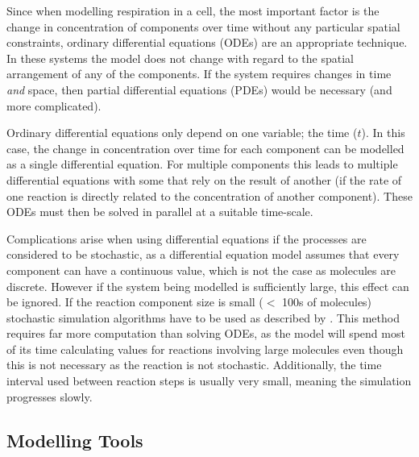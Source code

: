 Since when modelling respiration in a cell, the most important factor is the change in concentration of components over time without any particular spatial constraints, ordinary differential equations (ODEs) are an appropriate technique. In these systems the model does not change with regard to the spatial arrangement of any of the components. If the system requires changes in time \textit{and} space, then partial differential equations (PDEs) would be necessary (and more complicated)\cite{Klipp2005}.

Ordinary differential equations only depend on one variable; the time ($t$). In this case, the change in concentration over time for each component can be modelled as a single differential equation. For multiple components this leads to multiple differential equations with some that rely on the result of another (if the rate of one reaction is directly related to the concentration of another component). These ODEs must then be solved in parallel at a suitable time-scale.

Complications arise when using differential equations if the processes are considered to be stochastic, as a differential equation model assumes that every component can have a continuous value, which is not the case as molecules are discrete. However if the system being modelled is sufficiently large, this effect can be ignored. If the reaction component size is small ($<$ 100s of molecules) stochastic simulation algorithms have to be used as described by \citet{Gillespie1977}. This method requires far more computation than solving ODEs, as the model will spend most of its time calculating values for reactions involving large molecules even though this is not necessary as the reaction is not stochastic. Additionally, the time interval used between reaction steps is usually very small, meaning the simulation progresses slowly\cite{Klipp2005}.

\subsection{Modelling Tools}

